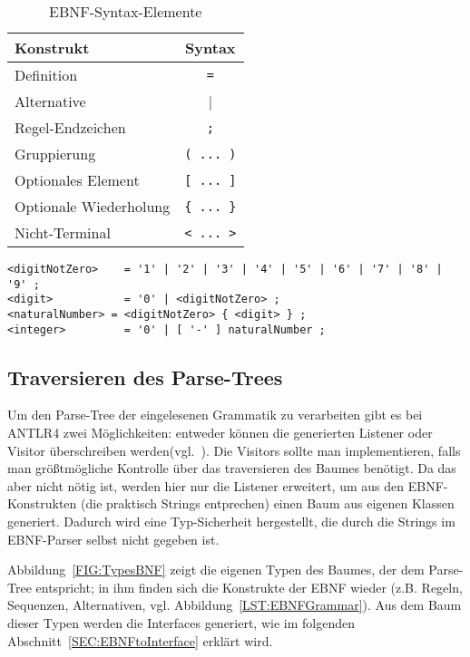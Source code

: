 \documentclass[../InterneDSLs.tex]{subfiles}
\begin{document}
\begin{table}[ht]
\centering
\begin{tabular}{l|c}
\textbf{Konstrukt}     & \textbf{Syntax}\\\hline
Definition             & \verb|=|\\
Alternative            & |\\
Regel-Endzeichen       & \verb|;|\\
Gruppierung            & \verb|( ... )|\\
Optionales Element     & \verb|[ ... ]|\\
Optionale Wiederholung & \verb|{ ... }|\\
Nicht-Terminal         & \verb|< ... >|\\
\end{tabular}
\caption{EBNF-Syntax-Elemente}
\label{TAB:EBNFSyntax}
\end{table}

\begin{lstlisting}[caption={Zahlen in der festgelegten Notation},label={LST:EbnfNumbers}]
<digitNotZero>    = '1' | '2' | '3' | '4' | '5' | '6' | '7' | '8' | '9' ;
<digit>           = '0' | <digitNotZero> ;
<naturalNumber> = <digitNotZero> { <digit> } ;
<integer>         = '0' | [ '-' ] naturalNumber ;
\end{lstlisting}

\begin{figure}[ht]

\end{figure}

\subsection{Traversieren des Parse-Trees}
Um den Parse-Tree der eingelesenen Grammatik zu verarbeiten gibt es bei ANTLR4 zwei Möglichkeiten: entweder können die generierten Listener oder Visitor überschreiben werden(vgl.~\cite[S. 112 ff]{Parr.2012}). Die Visitors sollte man implementieren, falls man größtmögliche Kontrolle über das traversieren des Baumes benötigt. Da das aber nicht nötig ist, werden hier nur die Listener erweitert, um aus den EBNF-Konstrukten (die praktisch Strings entprechen) einen Baum aus eigenen Klassen generiert. Dadurch wird eine Typ-Sicherheit hergestellt, die durch die Strings im EBNF-Parser selbst nicht gegeben ist.

Abbildung~\ref{FIG:TypesBNF} zeigt die eigenen Typen des Baumes, der dem Parse-Tree entspricht; in ihm finden sich die Konstrukte der EBNF wieder (z.B. Regeln, Sequenzen, Alternativen, vgl. Abbildung~\ref{LST:EBNFGrammar}). Aus dem Baum dieser Typen werden die Interfaces generiert, wie im folgenden Abschnitt~\ref{SEC:EBNFtoInterface} erklärt wird.
\end{document}
